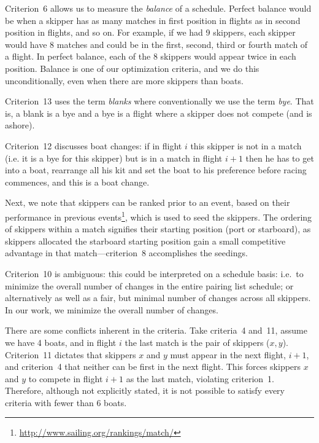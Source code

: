 \documentclass{llncs}
\begin{document}
Criterion~6 allows us to measure the \emph{balance} of a schedule. Perfect balance would be when a skipper has as many matches in first position in flights as in second position in flights, and so on. For example, if we had 9 skippers, each skipper would have 8 matches and could be in the first, second, third or fourth match of a flight. In perfect balance, each of the 8 skippers would appear twice in each position. Balance is one of our optimization criteria, and we do this unconditionally, even when there are more skippers than boats.

Criterion~13 uses the term \emph{blanks} where conventionally we use the term \emph{bye}. That is, a blank is a bye and a bye is a flight where a skipper does not compete (and is ashore).

Criterion~12 discusses boat changes: if in flight $i$ this skipper is not in a match (i.e. it is a
bye for this skipper) but is in a match in flight $i+1$ then he has to get into a boat, rearrange
all his kit and set the boat to his preference before racing commences, and this is a boat change. 

Next, we note that skippers can be ranked prior to an event, based on their performance in
previous events\footnote{\url{http://www.sailing.org/rankings/match/}}, which is used to seed the
skippers. The ordering of skippers within a match signifies their starting position (port or
starboard), as skippers allocated the starboard starting position gain a small competitive
advantage in that match---criterion~8 accomplishes the seedings.

Criterion~10 is ambiguous: this could be interpreted on a schedule basis: i.e.\ to minimize the
overall number of changes in the entire pairing list schedule; or alternatively as well as a fair,
but minimal number of changes across all skippers. In our work, we minimize the overall number of changes.

There are some conflicts inherent in the criteria. Take criteria~4 and~11, assume we have 4 boats, and
in flight $i$ the last match is the pair of skippers ($x,y$). Criterion~11 dictates that skippers $x$
and $y$ must appear in the next flight, $i+1$, and criterion~4 that neither can be first in the next
flight. This forces skippers $x$ and $y$ to compete in flight $i+1$ as the last match, violating
criterion~1. Therefore, although not explicitly stated, it is not possible to satisfy every criteria
with fewer than 6 boats.
\end{document}
